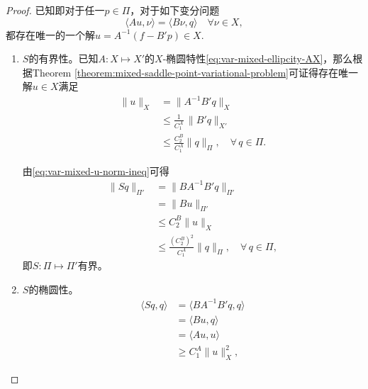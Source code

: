 \begin{proof}
  已知即对于任一$p \in \Pi$，对于如下变分问题
  \begin{equation*}
    \langle A u, \nu \rangle = \langle B \nu, q \rangle \quad \forall \nu \in X,
  \end{equation*}
  都存在唯一的一个解$u = A^{-1} \left( f - B' p \right) \in X$.

  \begin{enumerate}
    \item $S$的有界性。已知$A:X \mapsto X'$的$X$-椭圆特性\eqref{eq:var-mixed-ellipcity-AX}，那么根据Theorem \ref{theorem:mixed-saddle-point-variational-problem}可证得存在唯一解$u \in X$满足
  \begin{equation}
    \label{eq:var-mixed-u-norm-ineq}
  \begin{split}
  \big\| u \big\|_{X} &= \big\| A^{-1} B' q \big\|_{X} \\
  & \le \frac{1}{C_1^A} \, \big\| B' q \big\|_{X'} \\
  & \le \frac{C_2^B}{C_1^A} \big\| q \big\|_{\Pi}, \quad \forall \, q \in \Pi.
  \end{split}
  \end{equation}

  由\eqref{eq:var-mixed-u-norm-ineq}可得
  \begin{equation*}
    \begin{split}
      \big\| S q \big\|_{\Pi'} &= \big\| B A^{-1} B' q \big\|_{\Pi'} \\
      &= \big\| B u \big\|_{\Pi'} \\
      & \le C_2^B \big\| u \big\|_{X} \\
      & \le \frac{\left( C_2^B \right)^2}{C_1^A} \big\| q \big\|_{\Pi}, \quad \forall \, q \in \Pi,
    \end{split}
  \end{equation*}
  即$S:\Pi \mapsto \Pi'$有界。

\item $S$的椭圆性。
\begin{equation}
  \label{eq:var-mixed-sqq-inner-middle}
\begin{split}
  \langle S q, q \rangle &= \langle B A^{-1} B' q, q \rangle \\
  &= \langle B u, q \rangle \\
  &= \langle A u, u \rangle \\
  & \ge C_1^A \big\| u \big\|_X^2,
\end{split}
\end{equation}


\end{enumerate}
\end{proof}
